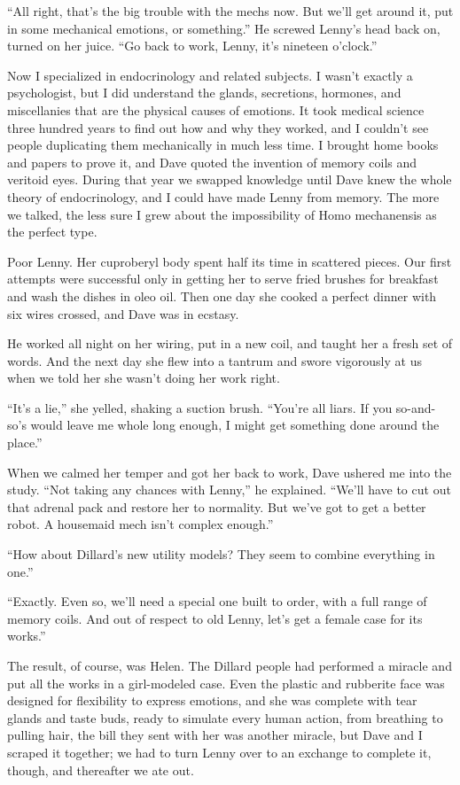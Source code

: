 \documentclass{article}
\begin{document}
“All right, that’s the big trouble with the mechs now. But we’ll get around it, put in some mechanical emotions, or something.” He screwed Lenny’s head back on, turned on her juice. “Go back to work, Lenny, it’s nineteen o’clock.”

Now I specialized in endocrinology and related subjects. I wasn’t exactly a psychologist, but I did understand the glands, secretions, hormones, and miscellanies that are the physical causes of emotions. It took medical science three hundred years to find out how and why they worked, and I couldn’t see people duplicating them mechanically in much less time. I brought home books and papers to prove it, and Dave quoted the invention of memory coils and veritoid eyes. During that year we swapped knowledge until Dave knew the whole theory of endocrinology, and I could have made Lenny from memory. The more we talked, the less sure I grew about the impossibility of Homo mechanensis as the perfect type.

Poor Lenny. Her cuproberyl body spent half its time in scattered pieces. Our first attempts were successful only in getting her to serve fried brushes for breakfast and wash the dishes in oleo oil. Then one day she cooked a perfect dinner with six wires crossed, and Dave was in ecstasy.

He worked all night on her wiring, put in a new coil, and taught her a fresh set of words. And the next day she flew into a tantrum and swore vigorously at us when we told her she wasn’t doing her work right.

“It’s a lie,” she yelled, shaking a suction brush. “You’re all liars. If you so-and-so’s would leave me whole long enough, I might get something done around the place.”

When we calmed her temper and got her back to work, Dave ushered me into the study. “Not taking any chances with Lenny,” he explained. “We’ll have to cut out that adrenal pack and restore her to normality. But we’ve got to get a better robot. A housemaid mech isn’t complex enough.”

“How about Dillard’s new utility models? They seem to combine everything in one.”

“Exactly. Even so, we’ll need a special one built to order, with a full range of memory coils. And out of respect to old Lenny, let’s get a female case for its works.”

The result, of course, was Helen. The Dillard people had performed a miracle and put all the works in a girl-modeled case. Even the plastic and rubberite face was designed for flexibility to express emotions, and she was complete with tear glands and taste buds, ready to simulate every human action, from breathing to pulling hair, the bill they sent with her was another miracle, but Dave and I scraped it together; we had to turn Lenny over to an exchange to complete it, though, and thereafter we ate out.
\end{document}
